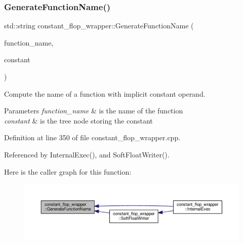 \subsubsection{\texorpdfstring{Generate\+Function\+Name()}{GenerateFunctionName()}}
{\footnotesize\ttfamily std\+::string constant\+\_\+flop\+\_\+wrapper\+::\+Generate\+Function\+Name (\begin{DoxyParamCaption}\item[{const std\+::string \&}]{function\+\_\+name,  }\item[{const \hyperlink{tree__node_8hpp_a3cf5d02292c940f3892425a5b5fdec3c}{tree\+\_\+node\+Const\+Ref}}]{constant }\end{DoxyParamCaption})\hspace{0.3cm}{\ttfamily [protected]}}



Compute the name of a function with implicit constant operand. 


\begin{DoxyParams}{Parameters}
{\em function\+\_\+name} & is the name of the function \\
\hline
{\em constant} & is the tree node storing the constant \\
\hline
\end{DoxyParams}


Definition at line 350 of file constant\+\_\+flop\+\_\+wrapper.\+cpp.



Referenced by Internal\+Exec(), and Soft\+Float\+Writer().

Here is the caller graph for this function\+:
\nopagebreak
\begin{figure}[H]
\begin{center}
\leavevmode
\includegraphics[width=350pt]{d4/da9/classconstant__flop__wrapper_a3932918373450f7c7a399b89488a7ec8_icgraph}
\end{center}
\end{figure}
\mbox{\label{classconstant__flop__wrapper_a5b36036f7cc799f0272e7301c79edaf6}} 
